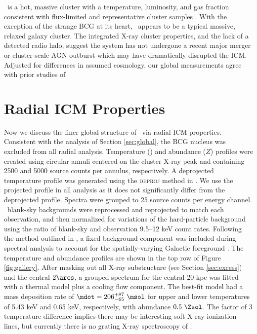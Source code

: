 \documentclass[useAMS,usenatbib]{mn2e}
\begin{document}
\rxj\ is a hot, massive cluster with a temperature, luminosity, and
gas fraction consistent with flux-limited and representative cluster
samples \citep{hiflugcs2, 2009A&A...498..361P}. With the exception of
the strange BCG at its heart, \rxj\ appears to be a typical massive,
relaxed galaxy cluster. The integrated X-ray cluster properties, and
the lack of a detected radio halo, suggest the system has not
undergone a recent major merger or cluster-scale AGN outburst which
may have dramatically disrupted the ICM. Adjusted for differences in
assumed cosmology, our global measurements agree with prior studies of
\irs\ \citep[\eg][]{2000MNRAS.315..269A}

\section{Radial ICM Properties}
\label{sec:rad}

Now we discuss the finer global structure of \rxj\ via radial ICM
properties. Consistent with the analysis of Section \ref{sec:global},
the BCG nucleus was excluded from all radial analysis. Temperature
(\tx) and abundance ($Z$) profiles were created using circular annuli
centered on the cluster X-ray peak and containing 2500 and 5000 source
counts per annulus, respectively. A deprojected temperature profile
was generated using the \textsc{deproj} method in \xspec. We use the
projected profile in all analysis as it does not significantly differ
from the deprojected profile. Spectra were grouped to 25 source counts
per energy channel. \caldb\ blank-sky backgrounds were reprocessed and
reprojected to match each observation, and then normalized for
variations of the hard-particle background using the ratio of
blank-sky and observation 9.5--12 keV count rates. Following the
method outlined in \citet{2005ApJ...628..655V}, a fixed background
component was included during spectral analysis to account for the
spatially-varying Galactic foreground \citep[see][for more
  detail]{xrayband}. The temperature and abundance profiles are shown
in the top row of Figure \ref{fig:gallery}. After masking out all
X-ray substructure (see Section \ref{sec:excess}) and the central
$2\arcs$, a grouped spectrum for the central 20 kpc was fitted with a
thermal model plus a cooling flow component. The best-fit model had a
mass deposition rate of $\mdot = 206^{+87}_{-65} ~\msol$ for upper and
lower temperatures of 5.43 keV and 0.65 keV, respectively, with
abundance $0.5 ~\Zsol$. The factor of 3 temperature difference implies
there may be interesting soft X-ray ionization lines, but currently
there is no grating X-ray spectroscopy of \irs.
\end{document}
